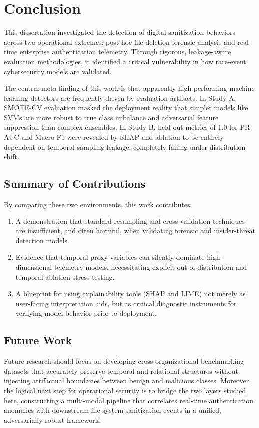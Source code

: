 \chapter{Conclusion}
\label{ch:conclusion}

This dissertation investigated the detection of digital sanitization behaviors across two operational extremes: post-hoc file-deletion forensic analysis and real-time enterprise authentication telemetry. Through rigorous, leakage-aware evaluation methodologies, it identified a critical vulnerability in how rare-event cybersecurity models are validated.

The central meta-finding of this work is that apparently high-performing machine learning detectors are frequently driven by evaluation artifacts. In Study A, SMOTE-CV evaluation masked the deployment reality that simpler models like SVMs are more robust to true class imbalance and adversarial feature suppression than complex ensembles. In Study B, held-out metrics of 1.0 for PR-AUC and Macro-F1 were revealed by SHAP and ablation to be entirely dependent on temporal sampling leakage, completely failing under distribution shift.

\section{Summary of Contributions}
By comparing these two environments, this work contributes:
\begin{enumerate}
    \item A demonstration that standard resampling and cross-validation techniques are insufficient, and often harmful, when validating forensic and insider-threat detection models.
    \item Evidence that temporal proxy variables can silently dominate high-dimensional telemetry models, necessitating explicit out-of-distribution and temporal-ablation stress testing.
    \item A blueprint for using explainability tools (SHAP and LIME) not merely as user-facing interpretation aids, but as critical diagnostic instruments for verifying model behavior prior to deployment.
\end{enumerate}

\section{Future Work}
Future research should focus on developing cross-organizational benchmarking datasets that accurately preserve temporal and relational structures without injecting artifactual boundaries between benign and malicious classes. Moreover, the logical next step for operational security is to bridge the two layers studied here, constructing a multi-modal pipeline that correlates real-time authentication anomalies with downstream file-system sanitization events in a unified, adversarially robust framework.
